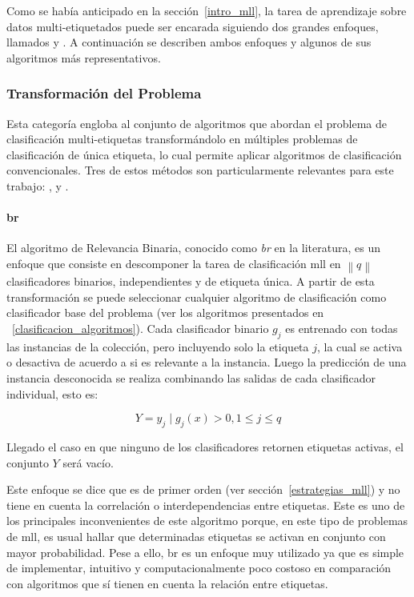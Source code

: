 Como se había anticipado en la sección~\ref{intro_mll}, la tarea de aprendizaje
sobre datos multi-etiquetados puede ser encarada siguiendo dos grandes enfoques,
llamados  y . A continuación se describen ambos enfoques y algunos de sus
algoritmos más representativos.

\subsubsection{Transformación del Problema}

Esta categoría engloba al conjunto de algoritmos que abordan el problema de
clasificación multi-etiquetas transformándolo en múltiples problemas de
clasificación de única etiqueta, lo cual permite aplicar algoritmos de
clasificación convencionales. Tres de estos métodos son particularmente
relevantes para este trabajo: ,  y
.

\paragraph{\acrfull{br}}

El algoritmo de Relevancia Binaria, conocido como \textit{\acrlong{br}} en la
literatura, es un enfoque que consiste en descomponer la tarea de clasificación
\acrshort{mll} en $\left\|q\right\|$ clasificadores binarios, independientes y
de etiqueta única.  A partir de esta transformación se puede seleccionar
cualquier algoritmo de clasificación como clasificador base del problema (ver
los algoritmos presentados en ~\ref{clasificacion_algoritmos}).  Cada
clasificador binario $g_{j}$ es entrenado con todas las instancias de la
colección, pero incluyendo solo la etiqueta $j$, la cual se activa o desactiva
de acuerdo a si es relevante a la instancia. Luego la predicción de una
instancia desconocida se realiza combinando las salidas de cada clasificador
individual, esto es:

\begin{equation}
	Y = {y_{j} \mid g_{j}(x) > 0, 1 \leq j \leq q}
\end{equation}

Llegado el caso en que ninguno de los clasificadores retornen etiquetas activas,
el conjunto $Y$ será vacío.

Este enfoque se dice que es de primer orden (ver sección~\ref{estrategias_mll})
y no tiene en cuenta la correlación o interdependencias entre etiquetas. Este es
uno de los principales inconvenientes de este algoritmo porque, en este tipo de
problemas de \acrshort{mll}, es usual hallar que determinadas etiquetas se
activan en conjunto con mayor probabilidad. Pese a ello, \acrshort{br} es un
enfoque muy utilizado \cite{zhang_review_2014} ya que es simple de implementar,
intuitivo y computacionalmente poco costoso en comparación con algoritmos que sí
tienen en cuenta la relación entre etiquetas.

